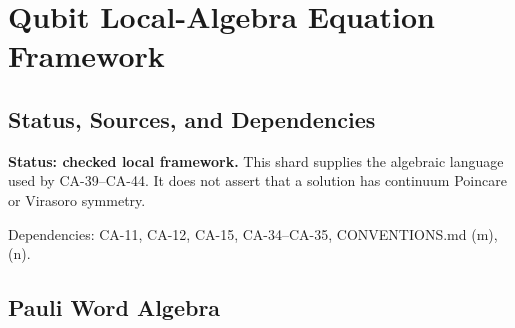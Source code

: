 
\section{Qubit Local-Algebra Equation Framework}
\label{sec:qubit-local-algebra-equation-framework}

\subsection{Status, Sources, and Dependencies}

\textbf{Status: checked local framework.}  This shard supplies the algebraic
language used by CA-39--CA-44.  It does not assert that a solution has
continuum Poincare or Virasoro symmetry.

Dependencies: CA-11, CA-12, CA-15, CA-34--CA-35, CONVENTIONS.md (m), (n).


\subsection{Pauli Word Algebra}

